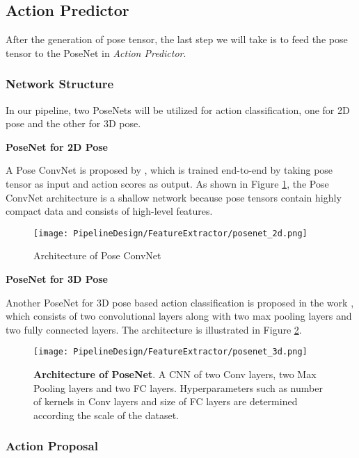 \subsection{Action Predictor}
\label{pipeline:AP}
After the generation of pose tensor, the last step we will take is to feed the pose tensor to the PoseNet in \textit{Action Predictor}. 

\subsubsection{Network Structure}

In our pipeline, two PoseNets will be utilized for action classification, one for 2D pose and the other for 3D pose.

\textbf{PoseNet for 2D Pose}

A Pose ConvNet is proposed by \cite{usman2018}, which is trained end-to-end by taking pose tensor as input and action scores as output. As shown in Figure \ref{fig:posenet_2d}, the Pose ConvNet architecture is a shallow network because pose tensors contain highly compact data and consists of high-level features. 

\begin{figure}[h!]
  \centering
  \texttt{[image: PipelineDesign/FeatureExtractor/posenet\_2d.png]}
  \caption{Architecture of Pose ConvNet \cite{usman2018}}  
  \label{fig:posenet_2d}
\end{figure}  


\textbf{PoseNet for 3D Pose}

Another PoseNet for 3D pose based action classification is proposed in the work \cite{lin2018}, which consists of two convolutional layers along with two max pooling layers and two fully connected layers.
The architecture is illustrated in Figure \ref{fig:posenet_3d}.  

\begin{figure}[h!]
  \centering
  \texttt{[image: PipelineDesign/FeatureExtractor/posenet\_3d.png]}
  \caption{\textbf{Architecture of PoseNet}. A CNN of two Conv layers, two Max Pooling layers and two
           FC layers. Hyperparameters such as number of kernels in Conv layers and size of FC layers
           are determined according the scale of the dataset. \cite{lin2018}}  
  \label{fig:posenet_3d}
\end{figure} 


\subsubsection{Action Proposal}

